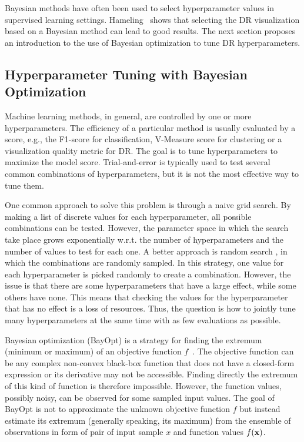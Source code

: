 Bayesian methods have often been used to select hyperparameter values in supervised learning settings. Hameling~\cite{harmeling2007exploring} shows that selecting the DR visualization based on a Bayesian method can lead to good results. The next section proposes an introduction to the use of Bayesian optimization to tune DR hyperparameters.

\subsection{Hyperparameter Tuning with Bayesian Optimization}\label{subsec:tune_with_BayOpt}


Machine learning methods, in general, are controlled by one or more hyperparameters.
The efficiency of a particular method is usually evaluated by a score,
e.g., the F1-score for classification, V-Measure score for clustering or
a visualization quality metric for DR.
The goal is to tune hyperparameters to
maximize the model score.
Trial-and-error is typically used to test several common combinations of hyperparameters,
but it is not the most effective way to tune them.

One common approach to solve this problem is through a naive grid search.
By making a list of discrete values for each hyperparameter,
all possible combinations can be tested.
However, the parameter space in which the search take place grows exponentially w.r.t. the number of hyperparameters
and the number of values to test for each one.
A better approach is random search \cite{bergstra2011algorithms}, in which the combinations are randomly sampled.
In this strategy, one value for each hyperparameter is picked randomly to create a combination.
However, the issue is that there are some hyperparameters that have a large effect, while some others have none.
This means that checking the values for the hyperparameter that has no effect is a loss of resources.
Thus, the question is how to jointly tune many hyperparameters at the same time
with as few evaluations as possible.

Bayesian optimization (BayOpt) is a strategy for finding the extremum (minimum or maximum) of an objective function $f$~\cite{mockus1975on}.
The objective function can be any complex non-convex black-box function that does not have a closed-form expression or its derivative may not be accessible.
Finding directly the extremum of this kind of function is therefore impossible.
However, the function values, possibly noisy, can be observed for some sampled input values.
The goal of BayOpt is not to approximate the unknown objective function $f$ but instead
estimate its extremum (generally speaking, its maximum) from the ensemble of observations
in form of pair of input sample $x$ and function values $f({\bf x})$.

